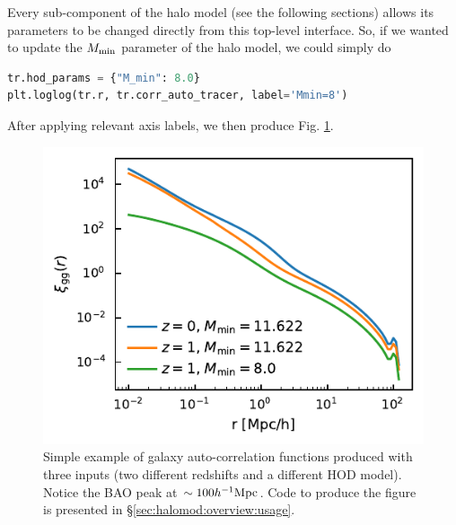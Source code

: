 \documentclass[5p,aas_macros]{elsarticle}
\providecommand{\DIFaddbeginFL}{} %
\providecommand{\DIFaddendFL}{} %
\providecommand{\DIFdelbeginFL}{} %
\providecommand{\DIFdelendFL}{} %
\begin{document}
Every sub-component of the halo model (see the following sections) allows its parameters to be changed directly from this top-level interface. So, if we wanted to update the $M_{\rm min}$ parameter of the halo model, we could simply do
%
\begin{lstlisting}[language=Python]
tr.hod_params = {"M_min": 8.0}
plt.loglog(tr.r, tr.corr_auto_tracer, label='Mmin=8')
\end{lstlisting}
After applying relevant axis labels, we then produce Fig. \ref{fig:toy_example}.

\begin{figure}
    \centering
    \DIFdelbeginFL %
\DIFdelendFL \DIFaddbeginFL \includegraphics[width=\linewidth]{toy_example.pdf}
    \DIFaddendFL \caption{Simple example of galaxy auto-correlation functions produced with three inputs (two different redshifts and a different HOD model).
    Notice the BAO peak at $\sim100 h^{-1}{\rm Mpc}$. Code to produce the figure is presented in \S\ref{sec:halomod:overview:usage}.}
    \label{fig:toy_example}
\end{figure}
\end{document}
